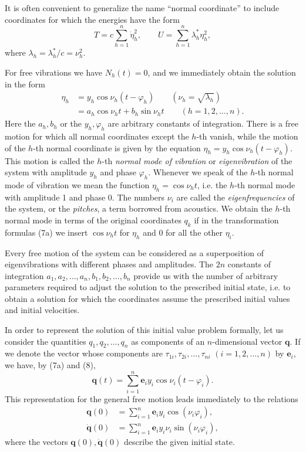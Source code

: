 It is often convenient to generalize the name ``normal coordinate'' to include coordinates for which the energies have the form
\[
T=c\sum_{h=1}^n\dot\eta_h^2,
\qquad
U=\sum_{h=1}^n\lambda_h^*\eta_h^2,
\]
where $\lambda_h=\lambda_h^*/c=\nu_h^2$.

For free vibrations we have $N_h(t)=0$, and we immediately obtain the solution in the form
\begin{equation}\tag{8}
\begin{aligned}
\eta_h&=y_h\cos\nu_h(t-\varphi_h)\qquad(\nu_h=\sqrt{\lambda_h})\\
&=a_h\cos\nu_ht+b_h\sin\nu_ht\qquad(h=1,2,\ldots,n).
\end{aligned}
\end{equation}
Here the $a_h,b_h$ or the $y_h,\varphi_h$ are arbitrary constants of integration. There is a free motion for which all normal coordinates except the $h$-th vanish, while the motion of the $h$-th normal coordinate is given by the equation $\eta_h=y_h\cos\nu_h(t-\varphi_h)$. This motion is called the $h$-th \emph{normal mode of vibration} or \emph{eigenvibration} of the system with amplitude $y_h$ and phase $\varphi_h$. Whenever we speak of the $h$-th normal mode of vibration we mean the function $\eta_h=\cos\nu_ht$, i.e. the $h$-th normal mode with amplitude 1 and phase 0. The numbers $\nu_i$ are called the \emph{eigenfrequencies} of the system, or the \emph{pitches}, a term borrowed from acoustics. We obtain the $h$-th normal mode in terms of the original coordinates $q_k$ if in the transformation formulas (7a) we insert $\cos\nu_ht$ for $\eta_h$ and 0 for all the other $\eta_i$.

Every free motion of the system can be considered as a superposition of eigenvibrations with different phases and amplitudes. The $2n$ constants of integration $a_1,a_2,\ldots,a_n,b_1,b_2,\ldots,b_n$ provide us with the number of arbitrary parameters required to adjust the solution to the prescribed initial state, i.e. to obtain a solution for which the coordinates assume the prescribed initial values and initial velocities.

In order to represent the solution of this initial value problem formally, let us consider the quantities $q_1,q_2,\ldots,q_n$ as components of an $n$-dimensional vector $\mathbf q$. If we denote the vector whose components are $\tau_{1i},\tau_{2i},\ldots,\tau_{ni}$ $(i=1,2,\ldots,n)$ by $\mathbf e_i$, we have, by (7a) and (8),
\[
\mathbf q(t)=\sum_{i=1}^n\mathbf e_i y_i\cos\nu_i(t-\varphi_i).
\]
This representation for the general free motion leads immediately to the relations
\begin{equation}\tag{9}
\begin{aligned}
\mathbf q(0)&=\sum_{i=1}^n\mathbf e_i y_i\cos(\nu_i\varphi_i),\\
\dot{\mathbf q}(0)&=\sum_{i=1}^n\mathbf e_i y_i\nu_i\sin(\nu_i\varphi_i),
\end{aligned}
\end{equation}
where the vectors $\mathbf q(0),\dot{\mathbf q}(0)$ describe the given initial state.

